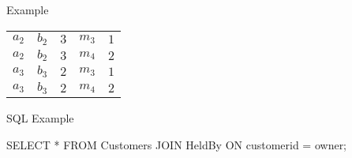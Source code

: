 \begin{multicols}{2}
\begin{CheatsheetEntryFrame}
\begin{RelAlgSubsection}{Example}
\begin{center}
{\begin{tabular}{|ccccc|}
                    $a_2$ & $b_2$ & $3$ & $m_3$ & $1$ \\
                    $a_2$ & $b_2$ & $3$ & $m_4$ & $2$ \\
                    $a_3$ & $b_3$ & $2$ & $m_3$ & $1$ \\
                    $a_3$ & $b_3$ & $2$ & $m_4$ & $2$ \\ \hline
                \end{tabular}
            }
        \end{center}
        \end{RelAlgSubsection}
        \SubsectionFrameReduceSkip
        \begin{SqlSubsection}{SQL Example}
            \begin{CheatsheetSubsectionLst}
                SELECT *
                FROM Customers
                    JOIN HeldBy ON customerid = owner;
            \end{CheatsheetSubsectionLst}

            \medskip


\end{SqlSubsection}
\end{CheatsheetEntryFrame}
\end{multicols}
